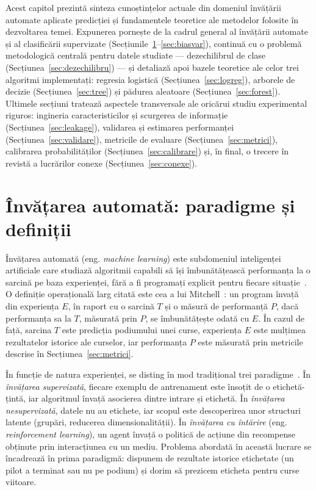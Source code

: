 \documentclass[12pt,a4paper]{report}
\begin{document}
Acest capitol prezintă sinteza cunoștințelor actuale din domeniul învățării automate aplicate
predicției și fundamentele teoretice ale metodelor folosite în dezvoltarea temei. Expunerea
pornește de la cadrul general al învățării automate și al clasificării supervizate
(Secțiunile~\ref{sec:ml}--\ref{sec:biasvar}), continuă cu o problemă metodologică centrală
pentru datele studiate --- dezechilibrul de clase (Secțiunea~\ref{sec:dezechilibru}) --- și
detaliază apoi bazele teoretice ale celor trei algoritmi implementați: regresia logistică
(Secțiunea~\ref{sec:logreg}), arborele de decizie (Secțiunea~\ref{sec:tree}) și pădurea
aleatoare (Secțiunea~\ref{sec:forest}). Ultimele secțiuni tratează aspectele transversale ale
oricărui studiu experimental riguros: ingineria caracteristicilor și scurgerea de informație
(Secțiunea~\ref{sec:leakage}), validarea și estimarea performanței (Secțiunea~\ref{sec:validare}),
metricile de evaluare (Secțiunea~\ref{sec:metrici}), calibrarea probabilităților
(Secțiunea~\ref{sec:calibrare}) și, în final, o trecere în revistă a lucrărilor conexe
(Secțiunea~\ref{sec:conexe}).

\section{Învățarea automată: paradigme și definiții}
\label{sec:ml}

Învățarea automată (eng. \emph{machine learning}) este subdomeniul inteligenței artificiale
care studiază algoritmii capabili să își îmbunătățească performanța la o sarcină pe baza
experienței, fără a fi programați explicit pentru fiecare situație~\cite{mitchell1997machine,
bishop2006pattern}. O definiție operațională larg citată este cea a lui
Mitchell~\cite{mitchell1997machine}: un program învață din experiența $E$, în raport cu o
sarcină $T$ și o măsură de performanță $P$, dacă performanța sa la $T$, măsurată prin $P$, se
îmbunătățește odată cu $E$. În cazul de față, sarcina $T$ este predicția podiumului unei curse,
experiența $E$ este mulțimea rezultatelor istorice ale curselor, iar performanța $P$ este
măsurată prin metricile descrise în Secțiunea~\ref{sec:metrici}.

În funcție de natura experienței, se disting în mod tradițional trei
paradigme~\cite{bishop2006pattern, hastie2009elements}. În \emph{învățarea supervizată},
fiecare exemplu de antrenament este însoțit de o etichetă-țintă, iar algoritmul învață
asocierea dintre intrare și etichetă. În \emph{învățarea nesupervizată}, datele nu au etichete,
iar scopul este descoperirea unor structuri latente (grupări, reducerea dimensionalității). În
\emph{învățarea cu întărire} (eng. \emph{reinforcement learning}), un agent învață o politică
de acțiune din recompense obținute prin interacțiunea cu un mediu. Problema abordată în această
lucrare se încadrează în prima paradigmă: dispunem de rezultate istorice etichetate (un pilot a
terminat sau nu pe podium) și dorim să prezicem eticheta pentru curse viitoare.
\end{document}
